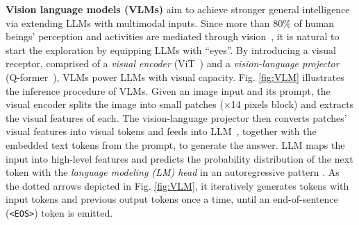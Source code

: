 \noindent
\textbf{Vision language models (VLMs)} aim to achieve stronger general intelligence via extending LLMs with multimodal inputs. 
Since more than 80\% of human beings’ perception and activities are mediated through vision~\cite{thomas2024vision}, it is natural to start the exploration by equipping LLMs with ``eyes''.
By introducing a visual receptor, comprised of a \textit{visual encoder} (\eg ViT~\cite{radford2021learning}) and a \textit{vision-language projector} (\eg Q-former~\cite{li2023blip}), VLMs power LLMs with visual capacity. 
Fig. \ref{fig:VLM} illustrates the inference procedure of VLMs.
Given an image input and its prompt, the visual encoder splits the image into small patches ($\times$14 pixels block) and extracts the visual features of each. 
The vision-language projector then converts patches' visual features into visual tokens and feeds into LLM~\cite{achiam2023gpt4, chowdhery2023palm, touvron2023llama2, jiang2023mistral}, together with the embedded text tokens from the prompt, to generate the answer. %
LLM maps the input into high-level features and predicts the probability distribution of the next token with the \textit{language modeling (LM) head} in an autoregressive pattern \cite{kwon2023efficient, yu2022orca}. 
As the dotted arrows depicted in Fig. \ref{fig:VLM}, it iteratively generates tokens with input tokens and previous output tokens once a time, until an end-of-sentence (\texttt{<EOS>}) token is emitted. 





